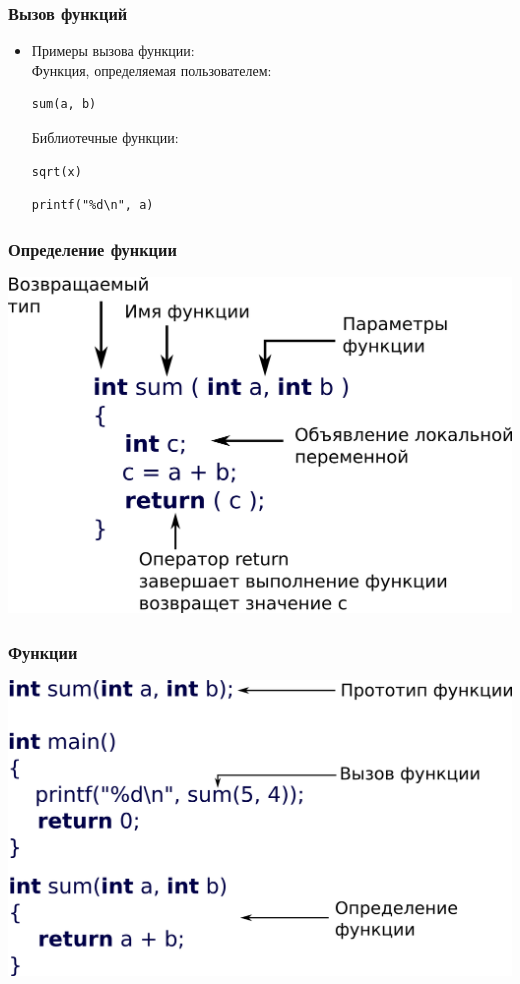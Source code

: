 \documentclass[12pt,pdf,hyperref={unicode}]{beamer}
\begin{document}
\begin{frame}[fragile]
\frametitle{Вызов функций} 
\begin{itemize}
\item Примеры вызова функции:\\
Функция, определяемая пользователем:\\
\begin{lstlisting}
sum(a, b)
\end{lstlisting}
Библиотечные функции:\\
\begin{lstlisting}
sqrt(x)
\end{lstlisting}
\begin{lstlisting}
printf("%d\n", a)
\end{lstlisting}
\end{itemize}
\end{frame}



\begin{frame}[fragile]
\frametitle{Определение функции} 
\begin{center}
\includegraphics[width=0.8\linewidth]{images/function_syntax.png}
\end{center}
\end{frame}

\begin{frame}[fragile]
\frametitle{Функции} 
\begin{center}
\includegraphics[width=0.8\linewidth]{images/function_summary.png}
\end{center}
\end{frame}
\end{document}
